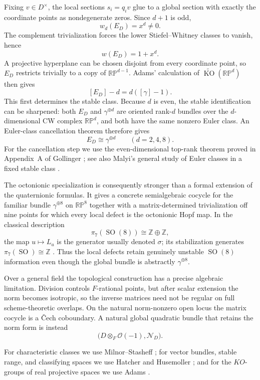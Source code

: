 \documentclass[12pt]{article}
\theoremstyle{plain}
\theoremstyle{definition}
\newcommand{\RP}{\mathbb{RP}}
\newcommand{\OO}{\mathcal O}
\newcommand{\SO}{\operatorname{SO}}
\newcommand{\KO}{\operatorname{KO}}
\begin{document}
Fixing $v\in D^\times$, the local sections $s_i=q_iv$ glue to a global
section with exactly the coordinate points as nondegenerate zeros.
Since $d+1$ is odd,
\[
w_d(E_D)=x^d\ne0.
\]
The complement trivialization forces the lower Stiefel--Whitney classes
to vanish, hence
\[
w(E_D)=1+x^d.
\]
A projective hyperplane can be chosen disjoint from every coordinate
point, so $E_D$ restricts trivially to a copy of $\RP^{d-1}$. Adams'
calculation of $\widetilde{\KO}(\RP^d)$ then gives
\[
[E_D]-d=d([\gamma]-1).
\]
This first determines the stable class. Because $d$ is even, the
stable identification can be sharpened: both $E_D$ and
$\gamma^{\oplus d}$ are oriented rank-$d$ bundles over the
$d$-dimensional CW complex $\RP^d$, and both have the same nonzero Euler
class. An Euler-class cancellation theorem therefore gives
\[
E_D\cong\gamma^{\oplus d}
\qquad(d=2,4,8).
\]
For the cancellation step we use the even-dimensional top-rank theorem
proved in Appendix~A of Gollinger \cite{Gollinger}; see also Malyi's
general study of Euler classes in a fixed stable class \cite{Malyi}.

The octonionic specialization is consequently stronger than a formal
extension of the quaternionic formulas. It gives a concrete
semialgebraic cocycle for the familiar bundle $\gamma^{\oplus8}$ on
$\RP^8$ together with a matrix-determined trivialization off nine
points for which every local defect is the octonionic Hopf map. In the
classical description
\[
\pi_7(\SO(8))\cong\mathbb Z\oplus\mathbb Z,
\]
the map $u\mapsto L_u$ is the generator usually denoted $\sigma$; its
stabilization generates $\pi_7(\SO)\cong\mathbb Z$
\cite{CardimLamMelloRandall}. Thus the local defects retain genuinely
unstable $\SO(8)$ information even though the global bundle is
abstractly $\gamma^{\oplus8}$.

Over a general field the topological construction has a precise
algebraic limitation. Division controls $F$-rational points, but after
scalar extension the norm becomes isotropic, so the inverse matrices
need not be regular on full scheme-theoretic overlaps. On the natural
norm-nonzero open locus the matrix cocycle is a \v{C}ech coboundary. A
natural global quadratic bundle that retains the norm form is instead
\[
\bigl(D\otimes_F\OO(-1),\mathscr N_D\bigr).
\]

For characteristic classes we use Milnor--Stasheff
\cite{MilnorStasheff}; for vector bundles, stable range, and classifying
spaces we use Hatcher and Husemoller \cite{Hatcher,Husemoller}; and for
the $KO$-groups of real projective spaces we use Adams \cite{Adams}.
\end{document}
